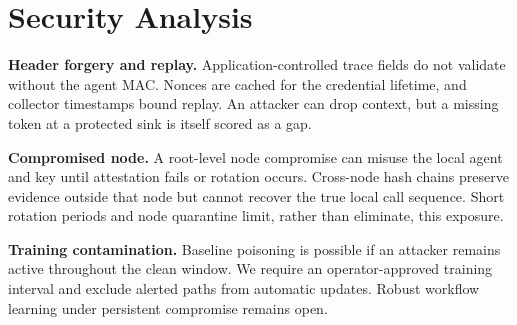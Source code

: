 \section{Security Analysis}
\label{sec:analysis}

\textbf{Header forgery and replay.}
Application-controlled trace fields do not validate without the agent MAC.
Nonces are cached for the credential lifetime, and collector timestamps bound
replay. An attacker can drop context, but a missing token at a protected sink is
itself scored as a gap.

\textbf{Compromised node.}
A root-level node compromise can misuse the local agent and key until attestation
fails or rotation occurs. Cross-node hash chains preserve evidence outside that
node but cannot recover the true local call sequence. Short rotation periods and
node quarantine limit, rather than eliminate, this exposure.

\textbf{Training contamination.}
Baseline poisoning is possible if an attacker remains active throughout the
clean window. We require an operator-approved training interval and exclude
alerted paths from automatic updates. Robust workflow learning under persistent
compromise remains open.

